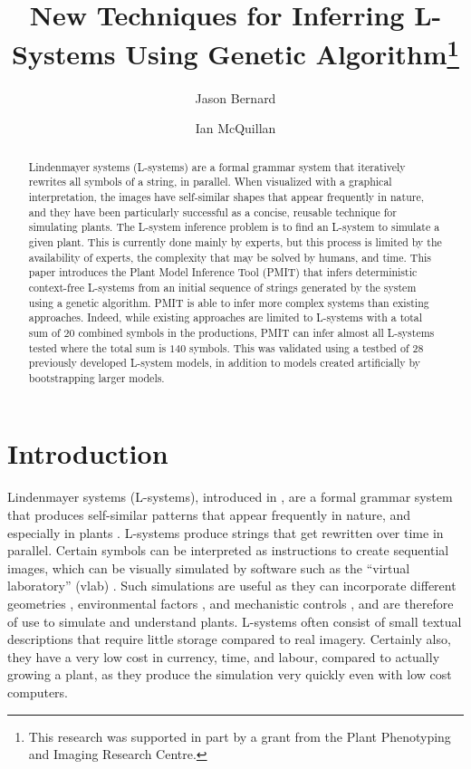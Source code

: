 \documentclass{llncs}
\begin{document}
	\title{New Techniques for Inferring L-Systems Using Genetic Algorithm\thanks{This research was supported in part by a grant from the Plant Phenotyping and Imaging Research Centre.}}
	\author{Jason Bernard \and Ian McQuillan}
	
	\maketitle
	
	\begin{abstract}
		Lindenmayer systems (L-systems) are a formal grammar system that iteratively rewrites all symbols of a string, in parallel. When visualized with a graphical interpretation, the images have self-similar shapes that appear frequently in nature, and they have been particularly successful as a concise, reusable technique for simulating plants. The L-system inference problem is to find an L-system to simulate a given plant. This is currently done mainly by experts, but this process is limited by the availability of experts, the complexity that may be solved by humans, and time. This paper introduces the Plant Model Inference Tool (PMIT) that infers deterministic context-free L-systems from an initial sequence of strings generated by the system using a genetic algorithm. PMIT is able to infer more complex systems than existing approaches. Indeed, while existing approaches are limited to L-systems with a total sum of $20$ combined symbols in the productions, PMIT can infer almost all L-systems tested where the total sum is $140$ symbols. This was validated using a testbed of 28 previously developed L-system models, in addition to models created artificially by bootstrapping larger models.
		
	\end{abstract}
	
	\section{Introduction}
	
	Lindenmayer systems (L-systems), introduced in \cite{lindenmayer_lsystems}, are a formal grammar system that produces self-similar patterns that appear frequently in nature, and especially in plants \cite{beauty}. L-systems produce strings that get rewritten over time in parallel. Certain symbols can be interpreted as instructions to create sequential images, which can be visually simulated by software such as the ``virtual laboratory'' (vlab) \cite{algorithmicbotany}. Such simulations are useful as they can incorporate different geometries \cite{beauty}, environmental factors \cite{drp_peach}, and mechanistic controls \cite{drp_auxin}, and are therefore of use to simulate and understand plants. L-systems often consist of small textual descriptions that require little storage compared to real imagery. Certainly also, they have a very low cost in currency, time, and labour, compared to actually growing a plant, as they produce the simulation very quickly even with low cost computers.
	
\end{document}
